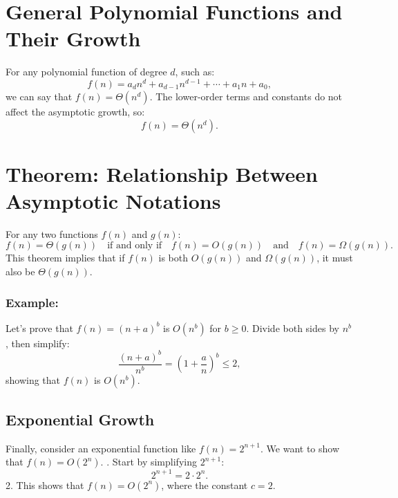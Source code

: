     \section{General Polynomial Functions and Their Growth}
    
    For any polynomial function of degree \(d\), such as:
    \[
    f(n) = a_d n^d + a_{d-1} n^{d-1} + \cdots + a_1 n + a_0,
    \]
    we can say that \(f(n) = \Theta(n^d)\). The lower-order terms and constants do not affect the asymptotic growth, so:
    \[
    f(n) = \Theta(n^d).
    \]
    
    \section{Theorem: Relationship Between Asymptotic Notations}
    
    For any two functions \(f(n)\) and \(g(n)\):
    \[
    f(n) = \Theta(g(n)) \quad \text{if and only if} \quad f(n) = O(g(n)) \quad \text{and} \quad f(n) = \Omega(g(n)).
    \]
    This theorem implies that if \(f(n)\) is both \(O(g(n))\) and \(\Omega(g(n))\), it must also be \(\Theta(g(n))\).
    
    \subsubsection{Example:}
    Let’s prove that \(f(n) = (n + a)^b\) is \(O(n^b)\) for \(b \geq 0\). Divide both sides by \(n^b\), then simplify:
    \[
    \frac{(n+a)^b}{n^b} = \left( 1 + \frac{a}{n} \right)^b \leq 2,
    \]
    showing that \(f(n)\) is \(O(n^b)\).
    
    \subsection{Exponential Growth}
    
    Finally, consider an exponential function like \(f(n) = 2^{n+1}\). We want to show that \(f(n) = O(2^n)\). . Start by simplifying \(2^{n+1}\):
    \[
    2^{n+1} = 2 \cdot 2^n.
    \]
    2. This shows that \(f(n) = O(2^n)\), where the constant \(c = 2\).
